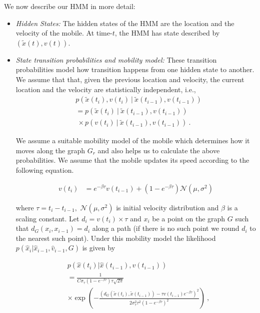 \documentclass[conference, 10pt]{IEEEtran}
\begin{document}
We now describe our HMM in more detail:
\begin{itemize}
\item  {\em Hidden States:} The hidden states of the HMM are the location and the
velocity of the mobile. At time-$t$, the HMM has state described by
$(\tilde{x}(t),v(t)).$

\item  {\em State transition probabilities and mobility model:} These transition
probabilities model how transition happens from one hidden state
to another. We assume that that, given the previous location and
velocity, the current location and the velocity are statistically independent, i.e.,
\begin{align*}
& p(\tilde{x}(t_i),v(t_i)\ |\ \tilde{x}(t_{i-1}),v(t_{i-1})) \\
&=p(\tilde{x}(t_i)\ |\ \tilde{x}(t_{i-1}),v(t_{i-1}))\\  
& \ \times p(v(t_i)\ |\ \tilde{x}(t_{i-1}),v(t_{i-1}))\ .
\end{align*}

We assume a suitable mobility model of the mobile which determines how it moves
along the graph $G_r$ and also helps us to calculate the above probabilities. We
assume that the mobile updates its speed according to the following equation.

\begin{align}
v(t_i) & = e^{-\beta \tau} v(t_{i-1}) + (1-e^{-\beta \tau}) \mathcal{N}(\mu,\sigma^2)
\label{eqn:tranVel}
\end{align}

where $\tau = t_i-t_{i-1},$ $\mathcal{N}(\mu,\sigma^2)$ is initial velocity
distribution and $\beta$ is a scaling constant. Let $d_i =
v(t_{i}) \times \tau$ and $x_{i}$ be a point on the graph $G$ such that
$d_G(x_i,x_{i-1}) = d_i$ along a path (if there is no such point we round $d_i$
to the nearest such point). Under this mobility model the likelihood
$p(\hat{x}_i|\hat{x}_{i-1},\hat{v}_{i-1},G)$ is given by

\begin{align}
& p(\hat{x}(t_i)|\hat{x}(t_{i-1}),v(t_{i-1})) \nonumber \\ 
& = \frac{1}{C \sigma_{\tau} (1-e^{-\beta \tau})\tau \sqrt{2 \pi }} \nonumber \\ 
& \times \exp \left( -\frac{(d_G(\tilde{x}(t_{i}),\tilde{x}(t_{i-1}))-\tau
{v}(t_{i-1}) e^{-\beta \tau} )^2}{2\sigma_{\tau}^2 \tau^2 (1-e^{-\beta
\tau})^2}\right)\ ,
\label{eqn:tranLoc}
\end{align}


\end{itemize}
\end{document}
